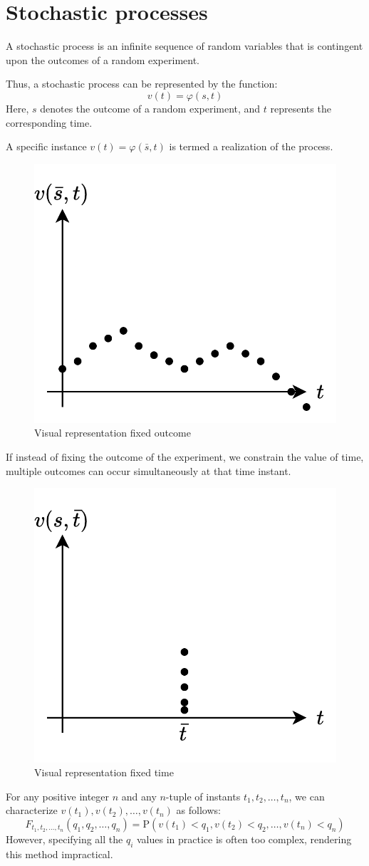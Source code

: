 \section{Stochastic processes}

\begin{definition}
    A stochastic process is an infinite sequence of random variables that is contingent upon the outcomes of a random experiment.
\end{definition}
Thus, a stochastic process can be represented by the function:
\[v(t)=\varphi(s,t)\]
Here, $s$ denotes the outcome of a random experiment, and $t$ represents the corresponding time.

\begin{definition}
    A specific instance $v(t) = \varphi(\bar{s}, t)$ is termed a realization of the process.
\end{definition}
\begin{figure}[H]
    \centering
    \includegraphics[width=0.25\linewidth]{images/outcome.png}
    \caption{Visual representation fixed outcome}
\end{figure}
If instead of fixing the outcome of the experiment, we constrain the value of time, multiple outcomes can occur simultaneously at that time instant.
\begin{figure}[H]
    \centering
    \includegraphics[width=0.25\linewidth]{images/time.png}
    \caption{Visual representation fixed time}
\end{figure}

For any positive integer $n$ and any $n$-tuple of instants $t_1, t_2, \dots, t_n$, we can characterize $v(t_1), v(t_2), \dots, v(t_n)$ as follows:
\[F_{t_1,t_2,\dots,t_n}(q_1,q_2,\dots,q_n)=\text{P}\left(v(t_1)<q_1,v(t_2)<q_2,\dots,v(t_n)<q_n\right)\]
However, specifying all the $q_i$ values in practice is often too complex, rendering this method impractical.

